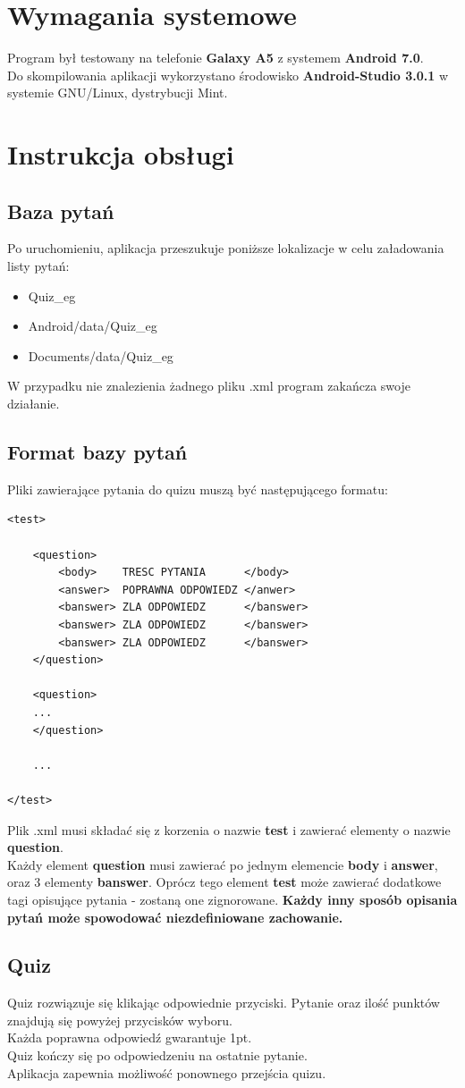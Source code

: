 \documentclass[12pt, a4paper]{article}
\begin{document}
\section{Wymagania systemowe}
Program był testowany na telefonie \textbf{Galaxy A5} z systemem \textbf{Android 7.0}.\\
Do skompilowania aplikacji wykorzystano środowisko \textbf{Android-Studio 3.0.1} w systemie GNU/Linux, dystrybucji Mint.
\section{Instrukcja obsługi}
\subsection{Baza pytań}
Po uruchomieniu, aplikacja przeszukuje poniższe lokalizacje w celu załadowania listy pytań:
\begin{itemize}
\item Quiz\_eg
\item Android/data/Quiz\_eg
\item Documents/data/Quiz\_eg
\end{itemize}
W przypadku nie znalezienia żadnego pliku .xml program zakańcza swoje działanie.
\newpage
\subsection{Format bazy pytań}
Pliki zawierające pytania do quizu muszą być następującego formatu:
\begin{lstlisting}
<test>

	<question>
		<body>    TRESC PYTANIA      </body>
		<answer>  POPRAWNA ODPOWIEDZ </anwer>
		<banswer> ZLA ODPOWIEDZ      </banswer>
		<banswer> ZLA ODPOWIEDZ      </banswer>
		<banswer> ZLA ODPOWIEDZ      </banswer>
	</question>

	<question>
	...
	</question>

	...

</test>
\end{lstlisting}
Plik .xml musi składać się z korzenia o nazwie \textbf{test} i zawierać elementy o nazwie \textbf{question}.\\
Każdy element \textbf{question} musi zawierać po jednym elemencie \textbf{body} i \textbf{answer}, oraz 3 elementy \textbf{banswer}.
Oprócz tego element \textbf{test} może zawierać dodatkowe tagi opisujące pytania - zostaną one zignorowane.
\textbf{Każdy inny sposób opisania pytań może spowodować niezdefiniowane zachowanie.}
\subsection{Quiz}
Quiz rozwiązuje się klikając odpowiednie przyciski. Pytanie oraz ilość punktów znajdują się powyżej przycisków wyboru.\\
Każda poprawna odpowiedź gwarantuje 1pt.\\
Quiz kończy się po odpowiedzeniu na ostatnie pytanie.\\
Aplikacja zapewnia możliwość ponownego przejścia quizu.
\end{document}
